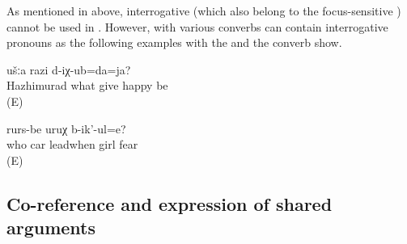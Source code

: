As mentioned in  above, interrogative  (which also belong to the focus-sensitive ) cannot be used in . However,  with various converbs can contain interrogative pronouns as the following examples with the   and the converb   show. 
%
\begin{exe}
	\ex	\label{ex:When Hazhimurad was given what we were happy}
		ušːa	razi	d-iχ-ub=da=ja?\\
		Hazhimurad	what	give		happy	be\\
	\glt	{} (E) 

	\ex	\label{ex:‎When who is guiding the car the girls get afraid}
	\gll	[hi-l	mašin	b-ik-an=qːel]	rurs-be	uruχ	b-ik'-ul=e?\\
		who	car	leadwhen	girl	fear		\\
	\glt	{} (E) 
\end{exe}



\subsection{Co-reference and expression of shared arguments}
\label{ssec:Co-reference and expression of shared arguments}

